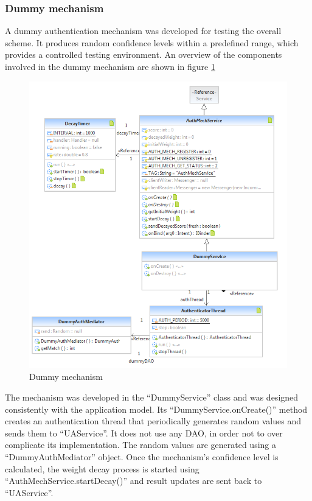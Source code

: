 \subsubsection{Dummy mechanism}
A dummy authentication mechanism was developed for testing the overall scheme. It produces random confidence levels within a predefined range, which provides a controlled testing environment. An overview of the components involved in the dummy mechanism are shown in figure \ref{fig:dummy}
\begin{figure}[h]
    \centering
    \includegraphics[width=\textwidth]{Pictures/dummy}
    \caption{Dummy mechanism}
    \label{fig:dummy}
\end{figure}

The mechanism was developed in the ``DummyService'' class and was designed consistently with the application model. Its ``DummyService.onCreate()'' method creates an authentication thread that periodically generates random values and sends them to ``UAService''. It does not use any DAO, in order not to over complicate its implementation. The random values are generated using a ``DummyAuthMediator'' object. Once the mechanism's confidence level is calculated, the weight decay process is started using ``AuthMechService.startDecay()'' and result updates are sent back to ``UAService''.

